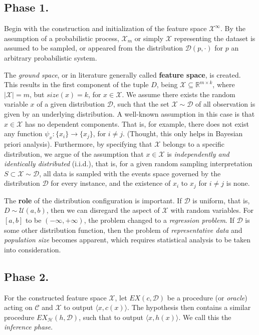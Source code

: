 \subsection*{Phase 1.}
Begin with the construction and initialization of the feature space $\mathcal{X}^{\infty}$. By the assumption of a probabilistic process, $\mathcal{X}_{m}$ or simply $\mathcal{X}$ representing the dataset is assumed to be sampled, or appeared from the distribution $\mathcal{D}(p,\cdot)$ for $p$ an arbitrary probabilistic system. 

The \textit{ground space}, or in literature generally called \textbf{feature space}, is created. This results in the first component of the tuple $D$, being $\mathcal{X}\subseteq \mathbb{R}^{m\times k}$, where $\lvert \mathcal{X} \rvert=m$, but $size(x)=k$, for $x\in\mathcal{X}$. We assume there exists the random variable $x$ of a given distribution $\mathcal{D}$, such that the set $\mathcal{X}\sim \mathcal{D}$ of all observation is given by an underlying distribution. A well-known assumption in this case is that $x\in\mathcal{X}$ has no dependent components. That is, for example, there does not exist any function $\psi_{x}: \{ x_{i} \}\to \{ x_{j} \}$, for $i\neq j$. (Thought, this only helps in Bayesian priori analysis). Furthermore, by specifying that $\mathcal{X}$ belongs to a specific distribution, we argue of the assumption that $x\in\mathcal{X}$ is \textit{independently and identically distributed} (i.i.d.), that is, for a given random sampling interpretation $S\subset\mathcal{X}\sim \mathcal{D}$, all data is sampled with the events space governed by the distribution $\mathcal{D}$ for every instance, and the existence of $x_{i}$ to $x_{j}$ for $i\neq j$ is none. 

The \textbf{role} of the distribution configuration is important. If $\mathcal{D}$ is uniform, that is, $D\sim \mathcal{U}(a,b)$, then we can disregard the aspect of $\mathcal{X}$ with random variables. For $[a,b]$ to be $(-\infty,+\infty)$, the problem changed to a \textit{regression problem}. If $\mathcal{D}$ is some other distribution function, then the problem of \textit{representative data} and \textit{population size} becomes apparent, which requires statistical analysis to be taken into consideration. 
\subsection*{Phase 2.}
For the constructed feature space $\mathcal{X}$, let $EX(c,\mathcal{D})$ be a procedure (or \textit{oracle}) acting on $\mathcal{C}$ and $\mathcal{X}$ to output $\langle x,c(x)\rangle$. The hypothesis then contains a similar procedure $EX_{\mathcal{H}}(h,\mathcal{D})$, such that to output $\langle x,h(x)\rangle$. We call this the \textit{inference phase}. 
    
